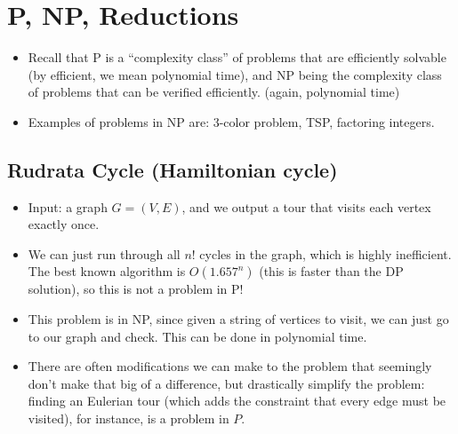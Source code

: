 \section{P, NP, Reductions}
\begin{itemize}
	\item Recall that P is a ``complexity class'' of problems that are efficiently solvable (by efficient, 
		we mean polynomial time), and NP being the complexity class of problems that can be verified 
		efficiently. (again, polynomial time)
	\item Examples of problems in NP are: 3-color problem, TSP, factoring integers.
\end{itemize}
\subsection{Rudrata Cycle (Hamiltonian cycle)}
\begin{itemize}
	\item Input: a graph \(G = (V, E)\), and we output a tour that visits each vertex exactly once. 
	\item We can just run through all \(n!\) cycles in the graph, which is highly inefficient. The best known 
		algorithm is \(O(1.657^n)\) (this is faster than the DP solution), so this is not a problem in P! 
	\item This problem is in NP, since given a string of vertices to visit, we can just go to our graph 
		and check. This can be done in polynomial time.  
	\item There are often modifications we can make to the problem that seemingly don't make that big of 
		a difference, but drastically simplify the problem: finding an Eulerian tour (which adds the constraint
		that every edge must be visited), for instance, is 
		a problem in \(P\). 
\end{itemize}

